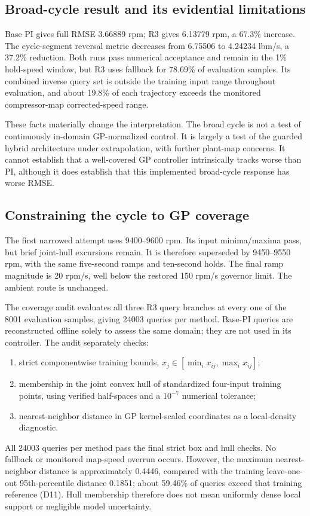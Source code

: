 \subsection{Broad-cycle result and its evidential limitations}

Base PI gives full RMSE 3.66889 rpm; R3 gives 6.13779 rpm, a 67.3\% increase. The cycle-segment reversal metric decreases from 6.75506 to 4.24234 lbm/s, a 37.2\% reduction. Both runs pass numerical acceptance and remain in the 1\% hold-speed window, but R3 uses fallback for 78.69\% of evaluation samples. Its combined inverse query set is outside the training input range throughout evaluation, and about 19.8\% of each trajectory exceeds the monitored compressor-map corrected-speed range.

These facts materially change the interpretation. The broad cycle is not a test of continuously in-domain GP-normalized control. It is largely a test of the guarded hybrid architecture under extrapolation, with further plant-map concerns. It cannot establish that a well-covered GP controller intrinsically tracks worse than PI, although it does establish that this implemented broad-cycle response has worse RMSE.


\subsection{Constraining the cycle to GP coverage}
The first narrowed attempt uses 9400--9600 rpm. Its input minima/maxima pass, but brief joint-hull excursions remain. It is therefore superseded by 9450--9550 rpm, with the same five-second ramps and ten-second holds. The final ramp magnitude is 20 rpm/s, well below the restored 150 rpm/s governor limit. The ambient route is unchanged.

The coverage audit evaluates all three R3 query branches at every one of the 8001 evaluation samples, giving 24003 queries per method. Base-PI queries are reconstructed offline solely to assess the same domain; they are not used in its controller. The audit separately checks:
\begin{enumerate}
\item strict componentwise training bounds, $x_j\in[\min_i x_{ij},\max_i x_{ij}]$;
\item membership in the joint convex hull of standardized four-input training points, using verified half-spaces and a $10^{-7}$ numerical tolerance;
\item nearest-neighbor distance in GP kernel-scaled coordinates as a local-density diagnostic.
\end{enumerate}
All 24003 queries per method pass the final strict box and hull checks. No fallback or monitored map-speed overrun occurs. However, the maximum nearest-neighbor distance is approximately 0.4446, compared with the training leave-one-out 95th-percentile distance 0.1851; about 59.46\% of queries exceed that training reference (D11). Hull membership therefore does not mean uniformly dense local support or negligible model uncertainty.

